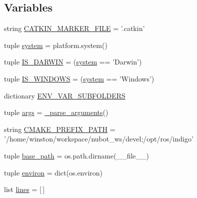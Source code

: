 \subsection*{Variables}
\begin{DoxyCompactItemize}
\item 
string \hyperlink{namespace__setup__util_a3fa0ca5a460a71a43cbc3d4954ab1f10}{C\-A\-T\-K\-I\-N\-\_\-\-M\-A\-R\-K\-E\-R\-\_\-\-F\-I\-L\-E} = '.catkin'
\item 
tuple \hyperlink{namespace__setup__util_a5883fa688e2e824754a412ffc772863e}{system} = platform.\-system()
\item 
tuple \hyperlink{namespace__setup__util_aecbb100ce6f94bb3c7e16d58fde05f96}{I\-S\-\_\-\-D\-A\-R\-W\-I\-N} = (\hyperlink{namespace__setup__util_a5883fa688e2e824754a412ffc772863e}{system} == 'Darwin')
\item 
tuple \hyperlink{namespace__setup__util_a6fe69c2dbd92959b6651a28cbb846e6e}{I\-S\-\_\-\-W\-I\-N\-D\-O\-W\-S} = (\hyperlink{namespace__setup__util_a5883fa688e2e824754a412ffc772863e}{system} == 'Windows')
\item 
dictionary \hyperlink{namespace__setup__util_aa31804f1be8660156ce9394b33c68dc4}{E\-N\-V\-\_\-\-V\-A\-R\-\_\-\-S\-U\-B\-F\-O\-L\-D\-E\-R\-S}
\item 
tuple \hyperlink{namespace__setup__util_ac67cb2d93e0636936bcbeb363e2c87c3}{args} = \hyperlink{namespace__setup__util_a68bdee5b1b36ce340607c5f122fc04ff}{\-\_\-parse\-\_\-arguments}()
\item 
string \hyperlink{namespace__setup__util_a44bed5f85daa4641b3c144edb9e8c1c1}{C\-M\-A\-K\-E\-\_\-\-P\-R\-E\-F\-I\-X\-\_\-\-P\-A\-T\-H} = '/home/winston/workspace/nubot\-\_\-ws/devel;/opt/ros/indigo'
\item 
tuple \hyperlink{namespace__setup__util_aecc545d18611814ee5d7ccdf6aa55f90}{base\-\_\-path} = os.\-path.\-dirname(\-\_\-\-\_\-file\-\_\-\-\_\-)
\item 
tuple \hyperlink{namespace__setup__util_a0a3189a3fa13a696964c791ed2a5ea85}{environ} = dict(os.\-environ)
\item 
list \hyperlink{namespace__setup__util_a8618d8be5f729d4c9696daa5e083a001}{lines} = \mbox{[}$\,$\mbox{]}
\end{DoxyCompactItemize}


